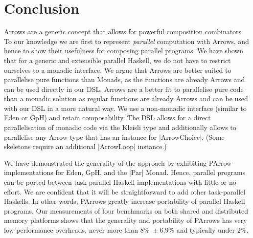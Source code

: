 
\section{Conclusion}
\label{sec:conclusion}
Arrows are a generic concept that allows for powerful composition
combinators. To our knowledge we are first to represent
\emph{parallel} computation with
Arrows, and hence to show their usefulness for
composing parallel
programs. We have shown that for a generic and extensible parallel Haskell, we do not have to restrict ourselves to a monadic interface. %
We argue that Arrows are better suited to  parallelise
pure functions than Monads,  as the functions are already Arrows and can be used
directly in our DSL.
Arrows are a better fit to parallelise pure code than a monadic solution as regular functions are already Arrows and can be used with our DSL in a more natural way. %
We use a non-monadic interface (similar to Eden or GpH) and retain composability.
%
The DSL allows for a direct parallelisation of monadic code via the Kleisli type and additionally allows to parallelise any Arrow type that has an instance for |ArrowChoice|. (Some skeletons require an additional |ArrowLoop| instance.)


We have demonstrated the generality of the approach by exhibiting PArrow implementations for Eden, GpH, and the |Par| Monad. Hence, parallel programs can be ported between task parallel Haskell implementations with little or no effort. We are confident that it will be straightforward to add other task-parallel Haskells.
%
In other words, PArrows greatly increase portability of parallel Haskell programs.
%
%
Our measurements of four benchmarks on both shared and distributed memory platforms shows that the generality and portability of PArrows has very low performance overheads, \ie never more than $8\% \; \pm 6.9\%$ and typically under $2\%$.

